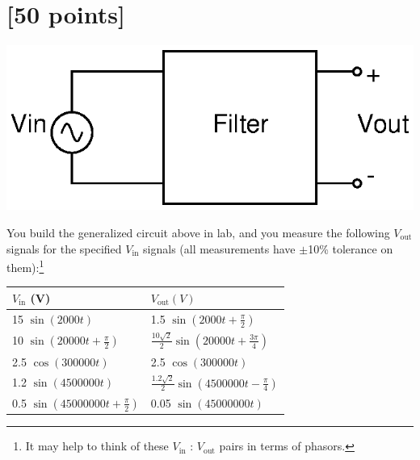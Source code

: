 

\section{[50 points]}

\begin{center}
\includegraphics[width=0.5\linewidth]{filter/filter.eps}
\end{center}

You build the generalized circuit above in lab, and you measure the following $V_\textrm{out}$ signals for the specified $V_\textrm{in}$ signals (all measurements have $\pm$10\% tolerance on them):\footnote{It may help to think of these $V_\textrm{in}$ : $V_\textrm{out}$ pairs in terms of phasors.}

\begin{large}
\begin{center}
\begin{tabular}{|l|l|} \hline
$V_\textrm{in}$ (V) & $V_\textrm{out} (V)$ \\ \hline
15 $\sin(2000t)$ & 1.5 $\sin(2000t + \frac{\pi}{2})$ \\
10 $\sin(20000t + \frac{\pi}{2})$ & $\frac{10\sqrt{2}}{2}\sin(20000t + \frac{3\pi}{4})$ \\
2.5 $\cos(300000t)$ & 2.5 $\cos(300000t)$ \\
1.2 $\sin(4500000t)$ & $\frac{1.2\sqrt{2}}{2}\sin(4500000t - \frac{\pi}{4})$ \\
0.5 $\sin(45000000t + \frac{\pi}{2})$ & 0.05 $\sin(45000000t)$ \\ \hline
\end{tabular}
\end{center}
\end{large}

